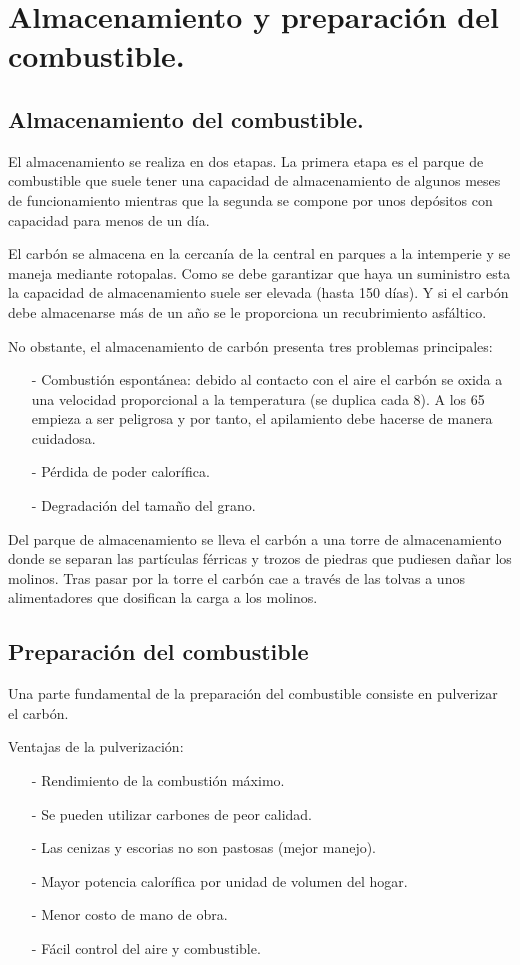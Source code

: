 \section{Almacenamiento y preparación del combustible.}
\subsection{Almacenamiento del combustible.}
El almacenamiento se realiza en dos etapas. La primera etapa es el parque de combustible que suele tener una capacidad de almacenamiento de algunos meses de funcionamiento mientras que la segunda se compone por unos depósitos con capacidad para menos de un día.



El carbón se almacena en la cercanía de la central en parques a la intemperie y se maneja mediante rotopalas. Como se debe garantizar que haya un suministro esta la capacidad de almacenamiento suele ser elevada (hasta 150 días). Y si el carbón debe almacenarse más de un año se le proporciona un recubrimiento asfáltico.



No obstante, el almacenamiento de carbón presenta tres problemas principales:
\begin{itemize}
	\item [-] Combustión espontánea: debido al contacto con el aire el carbón se oxida a una velocidad proporcional a la temperatura (se duplica cada 8\grado). A los 65\grado $\ $ empieza a ser peligrosa y por tanto, el apilamiento debe hacerse de manera cuidadosa.
	\item [-] Pérdida de poder calorífica.
	\item [-] Degradación del tamaño del grano.
\end{itemize}


Del parque de almacenamiento se lleva el carbón a una torre de almacenamiento donde se separan las partículas férricas y trozos de piedras que pudiesen dañar los molinos. Tras pasar por la torre el carbón cae a través de las tolvas a unos alimentadores que dosifican la carga a los molinos.
\subsection{Preparación del combustible}
Una parte fundamental de la preparación del combustible consiste en pulverizar el carbón. 



Ventajas de la pulverización:
\begin{itemize}
	\item [-] Rendimiento de la combustión máximo.
	\item [-] Se pueden utilizar carbones de peor calidad.
	\item [-] Las cenizas y escorias no son pastosas (mejor manejo).
	\item [-] Mayor potencia calorífica por unidad de volumen del hogar. 
	\item [-] Menor costo de mano de obra.
 	\item [-] Fácil control del aire y combustible.
\end{itemize}





